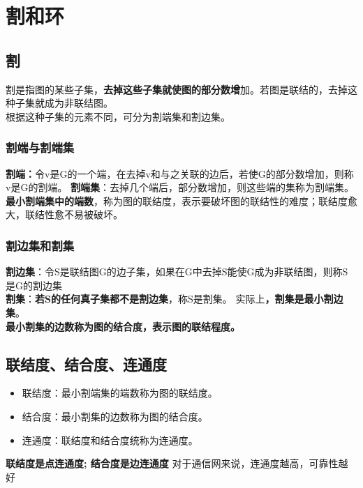 \section{割和环}
\subsection{割}
割是指图的某些子集，\textbf{去掉这些子集就使图的部分数增}加。若图是联结的，去掉这种子集就成为非联结图。\\
根据这种子集的元素不同，可分为割端集和割边集。
\subsubsection{割端与割端集}
\textbf{割端：}令v是G的一个端，在去掉v和与之关联的边后，若使G的部分数增加，则称v是G的割端。
\textbf{割端集}：去掉几个端后，部分数增加，则这些端的集称为割端集。\\
\textbf{最小割端集中的端数}，称为图的联结度，表示要破坏图的联结性的难度；联结度愈大，联结性愈不易被破坏。
\subsubsection{割边集和割集}
\textbf{割边集}：令S是联结图G的边子集，如果在G中去掉S能使G成为非联结图，则称S是G的割边集\\
\textbf{割集}：\textbf{若S的任何真子集都不是割边集}，称S是割集。
实际上\textbf{，割集是最小割边集}。\\
\textbf{最小割集的边数称为图的结合度，表示图的联结程度。}
\subsection{联结度、结合度、连通度}
\begin{itemize}
	\item 联结度：最小割端集的端数称为图的联结度。
	\item 结合度：最小割集的边数称为图的结合度。
	\item 连通度：联结度和结合度统称为连通度。
\end{itemize}
\textbf{联结度是点连通度;
结合度是边连通度}
对于通信网来说，连通度越高，可靠性越好
